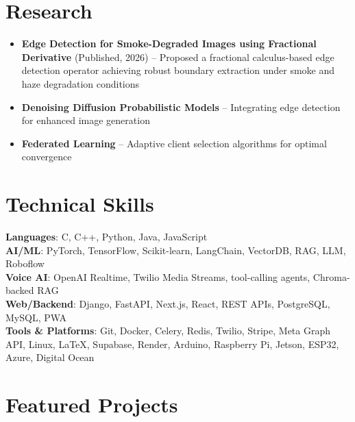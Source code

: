 \documentclass[letterpaper,11pt]{extarticle}
\makeatletter
\newcommand{\resumeItem}[1]{\item\small{#1}}
\newcommand{\resumeProjectHeading}[2]{
\item
\begin{tabular*}{0.97\textwidth}{l@{\extracolsep{\fill}}r}
\small\textbf{#1} & \small #2
\end{tabular*}
}
\newcommand{\resumeItemListStart}{\begin{itemize}[noitemsep,topsep=2pt]}
\newcommand{\resumeItemListEnd}{\end{itemize}}
\makeatother
\begin{document}
\section{Research}
\begin{itemize}[noitemsep, topsep=0pt]
\vspace{0.2cm}
    \item \textbf{Edge Detection for Smoke-Degraded Images using Fractional Derivative} (Published, 2026) -- Proposed a fractional calculus-based edge detection operator achieving robust boundary extraction under smoke and haze degradation conditions
    \vspace{0.2cm}
    \item \textbf{Denoising Diffusion Probabilistic Models} -- Integrating edge detection for enhanced image generation
    \vspace{0.2cm}
    \item \textbf{Federated Learning} -- Adaptive client selection algorithms for optimal convergence
\end{itemize}


\section{Technical Skills}
\small{
\textbf{Languages}: C, C++, Python, Java, JavaScript \\
\vspace{0.2cm}
\textbf{AI/ML}: PyTorch, TensorFlow, Scikit-learn, LangChain, VectorDB, RAG, LLM, Roboflow \\
\vspace{0.2cm}
\textbf{Voice AI}: OpenAI Realtime, Twilio Media Streams, tool-calling agents, Chroma-backed RAG \\
\vspace{0.2cm}
\textbf{Web/Backend}: Django, FastAPI, Next.js, React, REST APIs, PostgreSQL, MySQL, PWA \\
\vspace{0.2cm}
\textbf{Tools \& Platforms}: Git, Docker, Celery, Redis, Twilio, Stripe, Meta Graph API, Linux, LaTeX, Supabase, Render, Arduino, Raspberry Pi, Jetson, ESP32, Azure, Digital Ocean
}

\section{Featured Projects}
\end{document}
